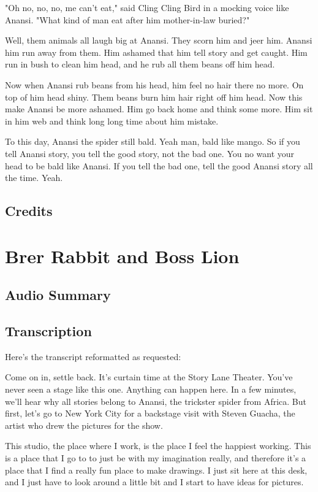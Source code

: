 "Oh no, no, no, me can't eat," said Cling Cling Bird in a mocking voice like Anansi. "What kind of man eat after him mother-in-law buried?"

Well, them animals all laugh big at Anansi. They scorn him and jeer him. Anansi him run away from them. Him ashamed that him tell story and get caught. Him run in bush to clean him head, and he rub all them beans off him head.

Now when Anansi rub beans from his head, him feel no hair there no more. On top of him head shiny. Them beans burn him hair right off him head. Now this make Anansi be more ashamed. Him go back home and think some more. Him sit in him web and think long long time about him mistake.

To this day, Anansi the spider still bald. Yeah man, bald like mango. So if you tell Anansi story, you tell the good story, not the bad one. You no want your head to be bald like Anansi. If you tell the bad one, tell the good Anansi story all the time. Yeah.

\subsection{Credits}

\section{Brer Rabbit and Boss Lion}

\subsection{Audio Summary}

\subsection{Transcription}

Here's the transcript reformatted as requested:

Come on in, settle back. It's curtain time at the Story Lane Theater. You've never seen a stage like this one. Anything can happen here. In a few minutes, we'll hear why all stories belong to Anansi, the trickster spider from Africa. But first, let's go to New York City for a backstage visit with Steven Guacha, the artist who drew the pictures for the show.

This studio, the place where I work, is the place I feel the happiest working. This is a place that I go to to just be with my imagination really, and therefore it's a place that I find a really fun place to make drawings. I just sit here at this desk, and I just have to look around a little bit and I start to have ideas for pictures.

